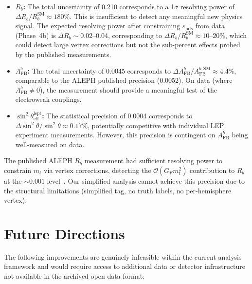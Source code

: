 \documentclass[11pt,a4paper]{article}
\begin{document}
\begin{itemize}
\item \textbf{$R_b$:} The total uncertainty of 0.210 corresponds to a 1$\sigma$ resolving
power of $\Delta R_b / R_b^\mathrm{SM} \approx 180\%$. This is insufficient to detect
any meaningful new physics signal. The expected resolving power after constraining
$\varepsilon_\mathrm{uds}$ from data (Phase~4b) is $\Delta R_b \sim 0.02$--0.04,
corresponding to $\Delta R_b / R_b^\mathrm{SM} \approx 10$--$20\%$, which could detect
large vertex corrections but not the sub-percent effects probed by the published
measurements.

\item \textbf{$A_\mathrm{FB}^b$:} The total uncertainty of 0.0045 corresponds to
$\Delta A_\mathrm{FB}^b / A_\mathrm{FB}^{b,\mathrm{SM}} \approx 4.4\%$, comparable
to the ALEPH published precision (0.0052). On data (where $A_\mathrm{FB}^b \neq 0$),
the measurement should provide a meaningful test of the electroweak couplings.

\item \textbf{$\sin^2\theta_\mathrm{eff}^\mathrm{lept}$:} The statistical precision
of 0.0004 corresponds to $\Delta \sin^2\theta / \sin^2\theta \approx 0.17\%$,
potentially competitive with individual LEP experiment measurements. However, this
precision is contingent on $A_\mathrm{FB}^b$ being well-measured on data.
\end{itemize}

The published ALEPH $R_b$ measurement had sufficient resolving power to constrain
$m_t$ via vertex corrections, detecting the $\mathcal{O}(G_F m_t^2)$ contribution
to $R_b$ at the $\sim 0.001$ level~\cite{ALEPH:Rb:1996}. Our simplified analysis
cannot achieve this precision due to the structural limitations (simplified tag,
no truth labels, no per-hemisphere vertex).

\FloatBarrier
{}
\section{Future Directions}
\label{sec:future}

The following improvements are genuinely infeasible within the current analysis
framework and would require access to additional data or detector infrastructure
not available in the archived open data format:
\end{document}
